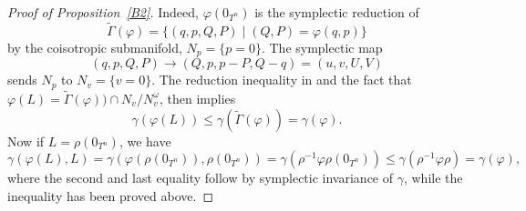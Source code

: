 \documentclass[JEP,XML,SOM,NoFloatCountersInSection,Unicode,published]{cedram}
\numberwithin{equation}{section}
\theoremstyle{plain}
\theoremstyle{definition}
\theoremstyle{remark}
\begin{document}
\begin{proof}[Proof of Proposition~\ref{B2}]
Indeed, $\varphi(0_{T^n})$ is the symplectic reduction of
\[
\widetilde\Gamma (\varphi) = \{(q,p,Q,P) \mid (Q,P)=\varphi (q,p)\}
\]
by the coisotropic submanifold, $N_p=\{p=0\}$.
The symplectic map
\[
(q,p,Q,P) \to (Q,p,p-P, Q-q)=(u,v,U,V)
\]
sends $N_p$ to $N_v=\{v=0\}$. The reduction inequality in \cite[Prop.\,5.1, p.\,705]{Viterbo-STAGGF} and the fact that $\varphi(L)= \widetilde \Gamma(\varphi)) \cap N_v / N_v^\omega$, then implies
\[
\gamma (\varphi (L)) \leq \gamma (\widetilde \Gamma (\varphi)) = \gamma (\varphi).
\]
Now if $L=\rho (0_{T^n})$, we have
\[
\gamma (\varphi (L), L) = \gamma (\varphi(\rho(0_{T^n})), \rho(0_{T^n})) = \gamma (\rho^{-1}\varphi \rho(0_{T^n})) \leq \gamma (\rho^{-1}\varphi \rho) = \gamma (\varphi),
\]
where the second and last equality follow by symplectic invariance of $\gamma$, while the inequality has been proved above.
\end{proof}
\end{document}
